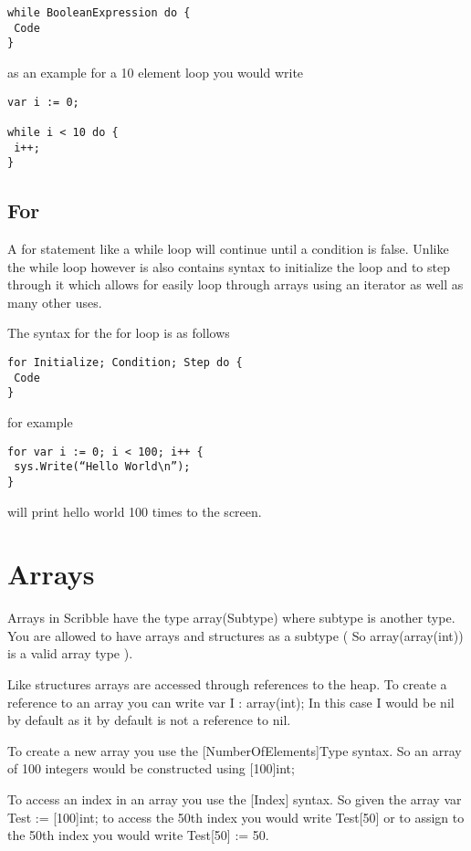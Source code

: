 \documentclass[]{final_report}
\begin{document}
\begin{verbatim}
while BooleanExpression do {
 Code
}
\end{verbatim}

as an example for a 10 element loop you would write

\begin{verbatim}
var i := 0;

while i < 10 do {
 i++;
}
\end{verbatim}

\subsection{For}

A for statement like a while loop will continue until a condition is false. Unlike the while loop however is also contains syntax to initialize the loop and to step through it which allows for easily loop through arrays using an iterator as well as many other uses.

The syntax for the for loop is as follows

\begin{verbatim}
for Initialize; Condition; Step do {
 Code
}
\end{verbatim}

for example

\begin{verbatim}
for var i := 0; i < 100; i++ {
 sys.Write(“Hello World\n”);
}
\end{verbatim}

will print hello world 100 times to the screen.

\section{Arrays}

Arrays in Scribble have the type array(Subtype) where subtype is another type. You are allowed to have arrays and structures as a subtype ( So array(array(int)) is a valid array type ).

Like structures arrays are accessed through references to the heap. To create a reference to an array you can write var I : array(int); In this case I would be nil by default as it by default is not a reference to nil.

To create a new array you use the [NumberOfElements]Type syntax. So an array of 100 integers would be constructed using [100]int;

To access an index in an array you use the [Index] syntax. So given the array var Test := [100]int; to access the 50th index you would write Test[50] or to assign to the 50th index you would write Test[50] := 50.
\end{document}
